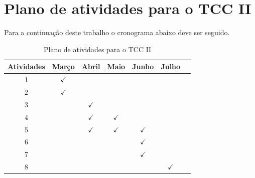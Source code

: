\documentclass[	12pt, Times, openright, twoside, a4paper, english, brazil]{abntex2}
\begin{document}
  \chapter{Plano de atividades para o TCC II}
    Para a continuação deste trabalho o cronograma abaixo deve ser seguido.

    \begin{table}[!ht]
    	\centering
    		\caption{Plano de atividades para o TCC II}	\label{tab:plano}
    		\begin{tabular}{|c|c|c|c|c|c|c|}
    			\hline  \textbf{Atividades} &	\textbf{Março} &	\textbf{Abril} & \textbf{Maio} & \textbf{Junho} & \textbf{Julho} \\
    			\hline 1 & $\checkmark$ 	& & & & 	\\
    			\hline 2 & $\checkmark$	& & & & 	\\
    			\hline 3 & 	&$\checkmark$ & & & 	\\
    			\hline 4 & 	&$\checkmark$ &$\checkmark$ & & 	\\
    			\hline 5 & 	&$\checkmark$ &$\checkmark$ &$\checkmark$ & 	\\
                \hline 6 &  & & &$\checkmark$ & 	\\
                \hline 7 & 	& & &$\checkmark$ & 	\\
                \hline 8 & 	& & & &$\checkmark$ 	\\
    			\hline 
    		\end{tabular}
    \end{table}
\end{document}
